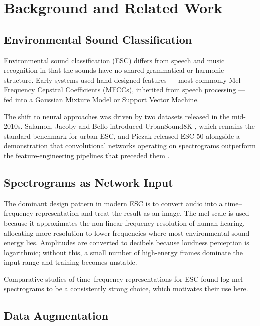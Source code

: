 \documentclass[11pt, a4paper]{article}
\begin{document}
\section{Background and Related Work}
\label{sec:related}

\subsection{Environmental Sound Classification}

Environmental sound classification (ESC) differs from speech and music recognition in that the sounds have no shared grammatical or harmonic structure. Early systems used hand-designed features --- most commonly Mel-Frequency Cepstral Coefficients (MFCCs), inherited from speech processing --- fed into a Gaussian Mixture Model or Support Vector Machine.

The shift to neural approaches was driven by two datasets released in the mid-2010s. Salamon, Jacoby and Bello introduced UrbanSound8K \cite{salamon2014}, which remains the standard benchmark for urban ESC, and Piczak released ESC-50 \cite{piczak2015} alongside a demonstration that convolutional networks operating on spectrograms outperform the feature-engineering pipelines that preceded them \cite{piczak2015cnn}.

\subsection{Spectrograms as Network Input}

The dominant design pattern in modern ESC is to convert audio into a time--frequency representation and treat the result as an image. The mel scale is used because it approximates the non-linear frequency resolution of human hearing, allocating more resolution to lower frequencies where most environmental sound energy lies. Amplitudes are converted to decibels because loudness perception is logarithmic; without this, a small number of high-energy frames dominate the input range and training becomes unstable.

Comparative studies of time--frequency representations for ESC \cite{huzaifah2017} found log-mel spectrograms to be a consistently strong choice, which motivates their use here.

\subsection{Data Augmentation}
\end{document}
